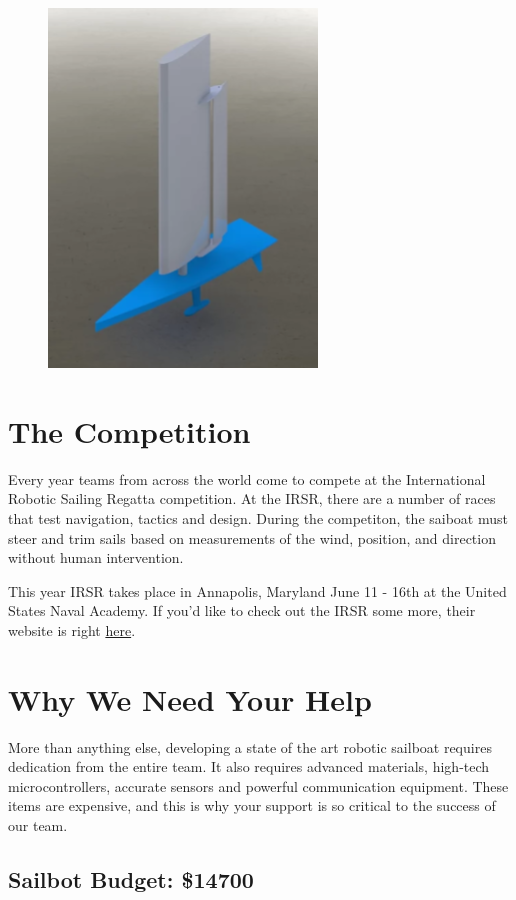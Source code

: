 \documentclass{article}
\begin{document}
\begin{figure}[H]
    \centering
    \includegraphics[scale=0.6]{sailbotRender.png}
\end{figure}

\section*{The Competition}
Every year teams from across the world come to compete at the International 
Robotic Sailing Regatta competition. At the IRSR, there are a number of races 
that test navigation, tactics and design. During the competiton, the saiboat 
must steer and trim sails based on measurements of the wind, position, and 
direction without human intervention.

This year IRSR takes place in Annapolis, Maryland June 11 - 16th at the United 
States Naval Academy. If you'd like to check out the IRSR some more, their 
website is right \href{http://sailbot.org}{here}.

\newpage

\section*{Why We Need Your Help}

More than anything else, developing a state of the art robotic sailboat requires 
dedication from the entire team. It also requires advanced materials, high-tech 
microcontrollers, accurate sensors and powerful communication equipment. These 
items are expensive, and this is why your support is so critical to the success 
of our team.

\subsection*{Sailbot Budget: \$14700}
\end{document}
